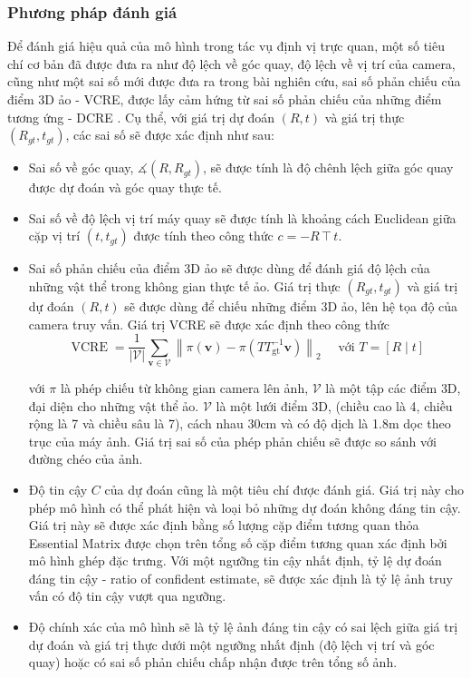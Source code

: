 \subsubsection{Phương pháp đánh giá}
Để đánh giá hiệu quả của mô hình trong tác vụ định vị trực quan, một số tiêu chí cơ bản đã được đưa ra như độ lệch về góc quay, độ lệch về vị trí của camera, cũng như một sai số mới được đưa ra trong bài nghiên cứu, sai số phản chiếu của điểm 3D ảo - VCRE, được lấy cảm hứng từ sai số phản chiếu của những điểm tương ứng - DCRE \cite{wald2020beyond}. Cụ thể, với giá trị dự đoán $(R,t)$ và giá trị thực $(R_{gt},t_{gt})$, các sai số sẽ được xác định như sau:
\begin{itemize}
  \item Sai số về góc quay, $\measuredangle(R,R_{gt})$, sẽ được tính là độ chênh lệch giữa góc quay được dự đoán và góc quay thực tế.
  \item Sai số về độ lệch vị trí máy quay sẽ được tính là khoảng cách Euclidean giữa cặp vị trí $(t,t_{gt})$ được tính theo công thức $c=-R \intercal t$.
  \item Sai số phản chiếu của điểm 3D ảo sẽ được dùng để đánh giá độ lệch của những vật thể trong không gian thực tế ảo. Giá trị thực $(R_{gt},t_{gt})$ và giá trị dự đoán $(R,t)$ sẽ được dùng để chiếu những điểm 3D ảo, lên hệ tọa độ của camera truy vấn. Giá trị VCRE sẽ được xác định theo công thức
        $$
          \operatorname{VCRE}=\frac{1}{|\mathcal{V}|} \sum_{\mathbf{v} \in \mathcal{V}}\left\|\pi(\mathbf{v})-\pi\left(T T_{\mathrm{gt}}^{-1} \mathbf{v}\right)\right\|_2 \quad \text { với } T=[R \mid t]
        $$

        với $\pi$ là phép chiếu từ không gian camera lên ảnh, $\mathcal{V}$ là một tập các điểm 3D, đại diện cho những vật thể ảo. $\mathcal{V}$ là một lưới điểm 3D, (chiều cao là 4, chiều rộng là 7 và chiều sâu là 7), cách nhau 30cm và có độ dịch là 1.8m dọc theo trục của máy ảnh. Giá trị sai số của phép phản chiếu sẽ được so sánh với đường chéo của ảnh.
  \item Độ tin cậy $C$ của dự đoán cũng là một tiêu chí được đánh giá. Giá trị này cho phép mô hình có thể phát hiện và loại bỏ những dự đoán không đáng tin cậy. Giá trị này sẽ được xác định bằng số lượng cặp điểm tương quan thỏa Essential Matrix được chọn trên tổng số cặp điểm tương quan xác định bởi mô hình ghép đặc trưng. Với một ngưỡng tin cậy nhất định, tỷ lệ dự đoán đáng tin cậy - ratio of confident estimate, sẽ được xác định là tỷ lệ ảnh truy vấn có độ tin cậy vượt qua ngưỡng.
  \item Độ chính xác của mô hình sẽ là tỷ lệ ảnh đáng tin cậy có sai lệch giữa giá trị dự đoán và giá trị thực dưới một ngưỡng nhất định (độ lệch vị trí và góc quay) hoặc có sai số phản chiếu chấp nhận được trên tổng số ảnh.
\end{itemize}

